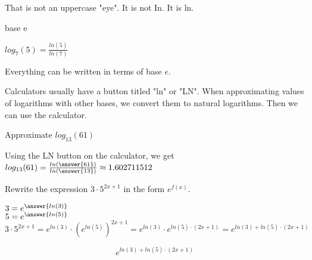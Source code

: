 \documentclass{ximera}
\begin{document}
That is not an uppercase "eye".  It is not In.  It is ln.





\begin{example}  base e


$log_7(5) = \frac{ln(5)}{ln(7)}$


\end{example}
Everything can be written in terms of base $e$.


Calculators usually have a button titled "ln" or "LN".  When approximating values of logarithms with other bases, we convert them to natural logarithms.  Then we can use the calculator.









\begin{example}  


Approximate $log_{13}(61)$


\begin{explanation}


Using the LN button on the calculator, we get $log_{13}(61) = \frac{ln\left(\answer{61}\right)}{ln\left(\answer{13}\right)} \approx 1.602711512$
\end{explanation}
\end{example}








\begin{example}  


Rewrite the expression $3 \cdot 5^{2x + 1}$ in the form $e^{f(x)}$.


\begin{explanation}


$3 = e^{\answer{ln(3)}}$ \\


$5 = e^{\answer{ln(5)}}$ \\


\[   3 \cdot 5^{2x + 1} = e^{ln(3)} \cdot (e^{ln(5)})^{2x + 1}  =  e^{ln(3)} \cdot e^{ln(5) \cdot (2x + 1)}  = e^{ln(3) + ln(5) \cdot (2x + 1)} \]


\[  e^{ln(3) + ln(5) \cdot (2x + 1)} \] 

\end{explanation}
\end{example}
\end{document}

